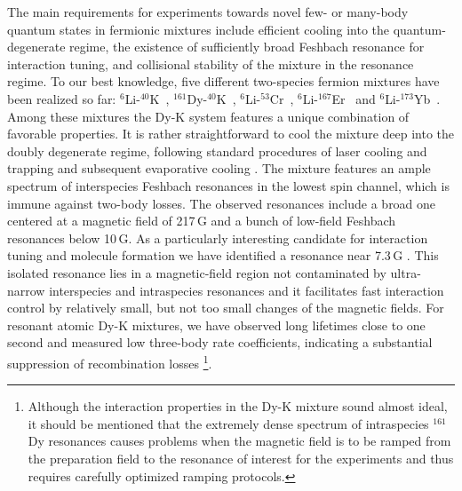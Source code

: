 The main requirements for experiments towards novel few- or many-body quantum states in fermionic mixtures include efficient cooling into the quantum-degenerate regime, the existence of sufficiently broad Feshbach resonance for interaction tuning, and collisional stability of the mixture in the resonance regime.
To our best knowledge, five different two-species fermion mixtures have been realized so far:
$^{6}$Li-$^{40}$K~\cite{Taglieber2008qdt, Wille2008eau, Voigt2009uhf,
	Trenkwalder2011heo, Naik2011fri},
$^{161}$Dy-$^{40}$K~\cite{Ravensbergen2018poa,Ravensbergen2020rif, Ye2022ool, Soave2023otf}, 
$^{6}$Li-$^{53}$Cr~\cite{Neri2020roa, Ciamei2022euc, Ciamei2022ddf, Finelli2024ula}, 
$^{6}$Li-$^{167}$Er~\cite{Schafer2023oof} and 
$^{6}$Li-$^{173}$Yb~\cite{Hara2011qdm, Green2020fri}.
Among these mixtures the Dy-K system features a unique combination of favorable properties. It is rather straightforward to cool the mixture deep into the doubly degenerate regime, following standard procedures of laser cooling and trapping and subsequent evaporative cooling \cite{Ravensbergen2018poa}. The mixture features an ample spectrum of interspecies Feshbach resonances in the lowest spin channel, which is immune against two-body losses. The observed resonances include a broad one centered at a magnetic field of 217\,G \cite{Ravensbergen2020rif} and a bunch of low-field Feshbach resonances \cite{Ye2022ool} below 10\,G. As a particularly interesting candidate for interaction tuning and molecule formation we have {identified} a resonance near 7.3\,G \cite{Ye2022ool, Soave2023otf}. {
	This isolated resonance lies in a magnetic-field region not contaminated by ultra-narrow interspecies and intraspecies \cite{Soave2022lff} resonances and it facilitates fast interaction control by relatively small, but not too small changes of the magnetic fields.} For resonant atomic Dy-K mixtures, we have observed long lifetimes close to one second and measured low three-body rate coefficients, indicating a substantial suppression of recombination losses 
\footnote{Although the interaction properties in the Dy-K mixture sound almost ideal, it should be mentioned that the extremely dense spectrum of intraspecies $^{161}$Dy resonances \cite{Burdick2016lls, Soave2022lff} causes problems when the magnetic field is to be ramped from the preparation field to the resonance of interest for the experiments and thus requires carefully optimized
	ramping protocols.}.

